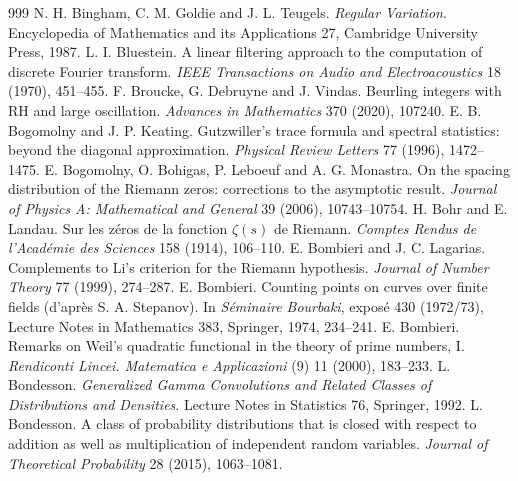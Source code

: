 \begin{thebibliography}{999}
 N. H. Bingham, C. M. Goldie and J. L. Teugels. \emph{Regular Variation}. Encyclopedia of Mathematics and its Applications 27, Cambridge University Press, 1987.
 L. I. Bluestein. A linear filtering approach to the computation of discrete Fourier transform. \emph{IEEE Transactions on Audio and Electroacoustics} 18 (1970), 451--455.
 F. Broucke, G. Debruyne and J. Vindas. Beurling integers with RH and large oscillation. \emph{Advances in Mathematics} 370 (2020), 107240.
 E. B. Bogomolny and J. P. Keating. Gutzwiller's trace formula and spectral statistics: beyond the diagonal approximation. \emph{Physical Review Letters} 77 (1996), 1472--1475.
 E. Bogomolny, O. Bohigas, P. Leboeuf and A. G. Monastra. On the spacing distribution of the Riemann zeros: corrections to the asymptotic result. \emph{Journal of Physics A: Mathematical and General} 39 (2006), 10743--10754.
 H. Bohr and E. Landau. Sur les z\'eros de la fonction $\zeta(s)$ de Riemann. \emph{Comptes Rendus de l'Acad\'emie des Sciences} 158 (1914), 106--110.
 E. Bombieri and J. C. Lagarias. Complements to Li's criterion for the Riemann hypothesis. \emph{Journal of Number Theory} 77 (1999), 274--287.
 E. Bombieri. Counting points on curves over finite fields (d'apr\`es S. A. Stepanov). In \emph{S\'eminaire Bourbaki}, expos\'e 430 (1972/73), Lecture Notes in Mathematics 383, Springer, 1974, 234--241. %
 E. Bombieri. Remarks on Weil's quadratic functional in the theory of prime numbers, I. \emph{Rendiconti Lincei. Matematica e Applicazioni} (9) 11 (2000), 183--233.
 L. Bondesson. \emph{Generalized Gamma Convolutions and Related Classes of Distributions and Densities}. Lecture Notes in Statistics 76, Springer, 1992.
 L. Bondesson. A class of probability distributions that is closed with respect to addition as well as multiplication of independent random variables. \emph{Journal of Theoretical Probability} 28 (2015), 1063--1081.

\end{thebibliography}
